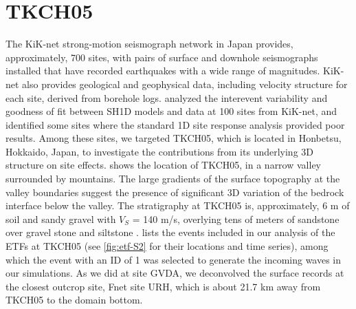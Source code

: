 {\section{TKCH05}\label{etf:tkch05}
The KiK-net strong-motion seismograph network in Japan provides, approximately, 700 sites, with pairs of surface and downhole seismographs installed that have recorded earthquakes with a wide range of magnitudes. KiK-net also provides geological and geophysical data, including velocity structure for each site, derived from borehole logs. \citet{thompsonTaxonomySiteResponse2012} analyzed the interevent variability and goodness of fit between SH1D models and data at 100 sites from KiK-net, and identified some sites where the standard 1D site response analysis provided poor results. Among these sites, we targeted TKCH05, which is located in Honbetsu, Hokkaido, Japan, to investigate the contributions from its underlying 3D structure on site effects.  shows the location of TKCH05, in a narrow valley surrounded by mountains. The large gradients of the surface topography at the valley boundaries suggest the presence of significant 3D variation of the bedrock interface below the valley. The stratigraphy at TKCH05 is, approximately, 6 m of soil and sandy gravel with $V_S$ = 140 m/s, overlying tens of meters of sandstone over gravel stone and siltstone \citep[see \cref{fig:etf-6};][]{nationalresearchinstituteforearthscienceanddisasterresilienceNIEDKNETKiKnet2019}.  lists the events included in our analysis of the ETFs at TKCH05 (see \cref{fig:etf-S2} for their locations and time series), among which the event with an ID of 1 was selected to generate the incoming waves in our simulations. As we did at site GVDA, we deconvolved the surface records at the closest outcrop site, Fnet site URH, which is about 21.7 km away from TKCH05 to the domain bottom.

}
